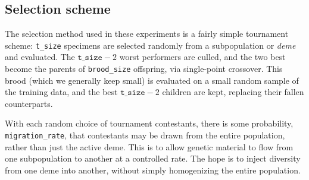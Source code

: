
\subsection{Selection scheme}

The selection method used in
these experiments is a fairly simple tournament scheme:
\texttt{t\_size} specimens are selected randomly from a
subpopulation or \emph{deme} and evaluated. The
$\texttt{t\_size}-2$ worst performers are culled, and the two
best become the parents of \texttt{brood\_size} offspring, via
single-point crossover. This brood (which we generally keep small)
is evaluated on a small random
sample of the training data, and the best $\texttt{t\_size} - 2$
children are kept, replacing their fallen counterparts. 

With each random choice of tournament contestants, there is some
probability, \texttt{migration\_rate}, that contestants may be
drawn from the entire population, rather than just the active
deme. This is to allow genetic material to flow from one
subpopulation to another at a controlled rate. The hope is to
inject diversity from one deme into another, without simply
homogenizing the entire population. 



